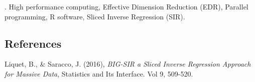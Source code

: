 \documentclass[12pt]{article}
\begin{document}
\vskip 2mm

.
High performance computing, Effective Dimension Reduction (EDR), Parallel programming, R software, Sliced Inverse Regression (SIR).

%        
%
%        

\vspace{-0.5cm}
\subsection*{References}

\begin{description}
{\footnotesize
\item Liquet, B.,  \& Saracco, J. (2016), \textit{BIG-SIR a Sliced Inverse Regression Approach for Massive Data}, Statistics and Its Interface. Vol 9, 509-520.}



\end{description}
\end{document}
